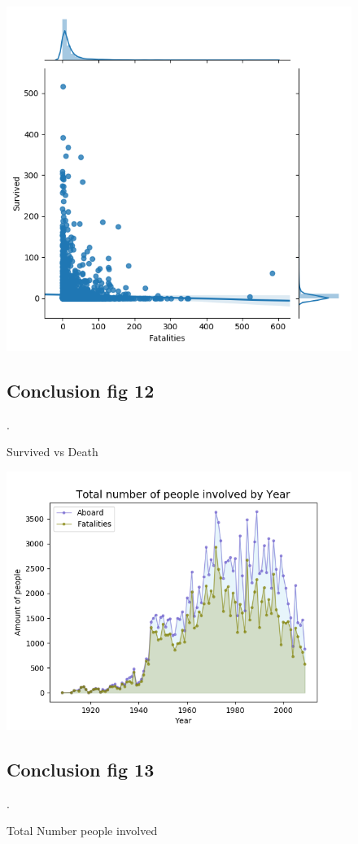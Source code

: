 \documentclass{article}
\begin{document}
\begin{figure}[!hbt]
\includegraphics[width=1.3\linewidth,height=0.500\textheight]{covSurvived,Death.png}
\caption{Survived vs Death }
\label{fig12:}
\subsection{Conclusion fig 12}
.
\end{figure}



\begin{figure}[!hbt]
\includegraphics[width=1.3\linewidth,height=0.500\textheight]{Total_Number_people_involved.png}
\caption{Total Number people involved }
\label{fig13:}
\subsection{Conclusion fig 13}
.
\end{figure}
\end{document}

